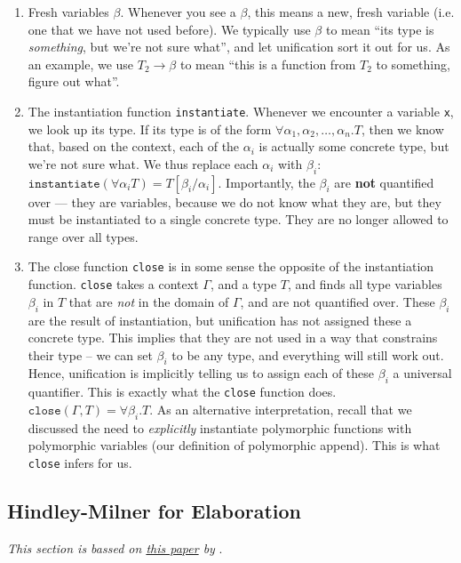 {\begin{enumerate}
    \item Fresh variables $\beta$. Whenever you see a $\beta$, this means a new, fresh variable (i.e. one that we have not used before). We typically use $\beta$ to mean ``its type is \textit{something}, but we're not sure what'', and let unification sort it out for us. As an example, we use $T_2 \to \beta$ to mean ``this is a function from $T_2$ to something, figure out what''. 
    \item The instantiation function \texttt{instantiate}. Whenever we encounter a variable \texttt{x}, we look up its type. If its type is of the form $\forall \alpha_1, \alpha_2, \ldots, \alpha_n . T$, then we know that, based on the context, each of the $\alpha_i$ is actually some concrete type, but we're not sure what. We thus replace each $\alpha_i$ with $\beta_i$: $\texttt{instantiate}(\forall \alpha_i T) = T[\beta_i / \alpha_i]$. Importantly, the $\beta_i$ are \textbf{not} quantified over --- they are variables, because we do not know what they are, but they must be instantiated to a single concrete type. They are no longer allowed to range over all types.
    \item The close function \texttt{close} is in some sense the opposite of the instantiation function. \texttt{close} takes a context $\Gamma$, and a type $T$, and finds all type variables $\beta_i$ in $T$ that are \textit{not} in the domain of $\Gamma$, and are not quantified over. These $\beta_i$ are the result of instantiation, but unification has not assigned these a concrete type. This implies that they are not used in a way that constrains their type -- we can set $\beta_i$ to be any type, and everything will still work out. Hence, unification is implicitly telling us to assign each of these $\beta_i$ a universal quantifier. This is exactly what the \texttt{close} function does. $\texttt{close}(\Gamma, T) = \forall \beta_i . T$. As an alternative interpretation, recall that we discussed the need to \textit{explicitly} instantiate polymorphic functions with polymorphic variables (our definition of polymorphic append). This is what \texttt{close} infers for us.
\end{enumerate}


\subsection{Hindley-Milner for Elaboration}
\textit{This section is bassed on \href{http://gallium.inria.fr/~fpottier/publis/fpottier-elaboration.pdf}{this paper} by} \citet{pottier-2014}.

}
